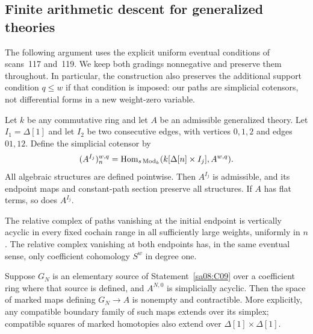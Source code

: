 \subsection{Finite arithmetic descent for generalized theories}

The following argument uses the explicit uniform eventual conditions of
scans~117 and~119. We keep both gradings nonnegative and preserve them
throughout. In particular, the construction also preserves the additional
support condition $q\le w$ if that condition is imposed: our paths are
simplicial cotensors, not differential forms in a new weight-zero
variable.

\begin{lemma}\label{sa08:C16}
Let $k$ be any commutative ring and let $A$ be an admissible generalized
theory. Let $I_1=\Delta[1]$ and let $I_2$ be two consecutive edges, with
vertices $0,1,2$ and edges $01,12$. Define the simplicial cotensor by
\[
 (A^{I_j})_n^{w,q}
 =\operatorname{Hom}_{s\operatorname{Mod}_k}
       (k[\Delta[n]\times I_j],A^{w,q}).
\]
All algebraic structures are defined pointwise. Then $A^{I_j}$ is
admissible, and its endpoint maps and constant-path section preserve
all structures. If $A$ has flat terms, so does $A^{I_j}$.

The relative complex of paths vanishing at the initial endpoint is
vertically acyclic in every fixed cochain range in all sufficiently
large weights, uniformly in $n$. The relative complex vanishing at
both endpoints has, in the same eventual sense, only coefficient
cohomology $S^w$ in degree one.

Suppose $G_N$ is an elementary source of
Statement~\ref{sa08:C09} over a coefficient ring where that source is
defined, and $A^{N,0}$ is simplicially acyclic. Then the space of
marked maps defining $G_N\to A$ is nonempty and contractible. More
explicitly, any compatible boundary family of such maps extends
over its simplex; compatible squares of marked homotopies also
extend over $\Delta[1]\times\Delta[1]$.
\end{lemma}
